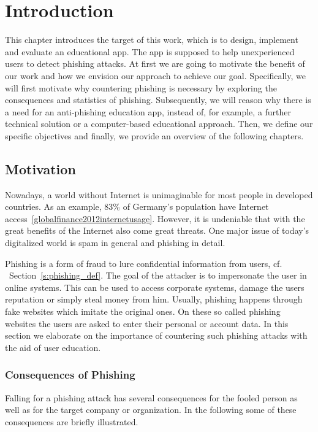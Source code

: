\section{Introduction}
\label{s:introduction}
This chapter introduces the target of this work, which is to design, implement and evaluate an educational app.
 The app is supposed to help unexperienced users to detect phishing attacks.
 At first we are going to motivate the benefit of our work and how we envision our approach to achieve our goal.
Specifically, we will first motivate why countering phishing is necessary by exploring the consequences and statistics of phishing.
Subsequently, we will reason why there is a need for an anti-phishing education app, instead of, for example, a further technical solution or a computer-based educational approach.
 Then, we define our specific objectives and finally, we provide an overview of the following chapters.


\subsection{Motivation}
Nowadays, a world without Internet is unimaginable for most people in developed countries.
As an example, 83\% of Germany's population have Internet access~\ref{globalfinance2012internetusage}. 
However, it is undeniable that with the great benefits of the Internet also come great threats. 
One major issue of today's digitalized world is spam in general and phishing in detail. 

Phishing is a form of fraud to lure confidential information from users, cf.
~Section~\ref{s:phishing_def}. The goal of the attacker is to impersonate the user in online systems.
 This can be used to access corporate systems, damage the users reputation or simply steal money from him.
 Usually, phishing happens through fake websites which imitate the original ones.
 On these so called phishing websites the users are asked to enter their personal or account data.
 In this section we elaborate on the importance of countering such phishing attacks with the aid of user education. 



\subsubsection{Consequences of Phishing}
Falling for a phishing attack has several consequences for the fooled person as well as for the target company or organization.
 In the following some of these consequences are briefly illustrated.


